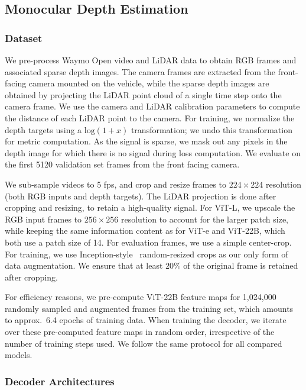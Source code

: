 \subsection{Monocular Depth Estimation}
\label{app:de}

\subsubsection{Dataset}

We pre-process Waymo Open video and LiDAR data to obtain RGB frames and associated sparse depth images. The camera frames are extracted from the front-facing camera mounted on the vehicle, while the sparse depth images are obtained by projecting the LiDAR point cloud of a single time step onto the camera frame. We use the camera and LiDAR calibration parameters to compute the distance of each LiDAR point to the camera. For training, we normalize the depth targets using a $\mathrm{log}(1+x)$ transformation; we undo this transformation for metric computation. As the signal is sparse, we mask out any pixels in the depth image for which there is no signal during loss computation.
We evaluate on the first 5120 validation set frames from the front facing camera.

We sub-sample videos to 5 fps, and crop and resize frames to $224\times224$ resolution (both RGB inputs and depth targets). The LiDAR projection is done after cropping and resizing, to retain a high-quality signal. For ViT-L, we upscale the RGB input frames to $256\times256$ resolution to account for the larger patch size, while keeping the same information content as for ViT-e and ViT-22B, which both use a patch size of 14. For evaluation frames, we use a simple center-crop. For training, we use Inception-style~\citep{szegedy2015going} random-resized crops as our only form of data augmentation. We ensure that at least $20\%$ of the original frame is retained after cropping.

For efficiency reasons, we pre-compute ViT-22B feature maps for 1,024,000 randomly sampled and augmented frames from the training set, which amounts to approx.~6.4 epochs of training data. When training the decoder, we iterate over these pre-computed feature maps in random order, irrespective of the number of training steps used. We follow the same protocol for all compared models.

\subsubsection{Decoder Architectures}

